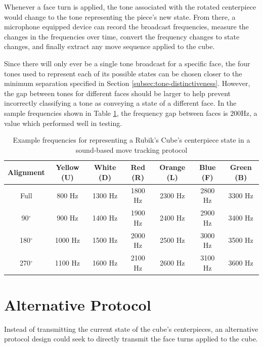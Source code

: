 Whenever a face turn is applied, the tone associated with the rotated centerpiece would change to the tone representing the piece's new state.
From there, a microphone equipped device can record the broadcast frequencies, measure the changes in the frequencies over time, convert the frequency changes to state changes, and finally extract any move sequence applied to the cube.

Since there will only ever be a single tone broadcast for a specific face, the four tones used to represent each of its possible states can be chosen closer to the minimum separation specified in Section \ref{subsec:tone-distinctiveness}. 
However, the gap between tones for different faces should be larger to help prevent incorrectly classifying a tone as conveying a state of a different face. 
In the sample frequencies shown in Table \ref{table:centerpiece-frequencies}, the frequency gap between faces is 200Hz, a value which performed well in testing.

\begin{table}[h]
    \centering
    \begin{tabular}{ | c | c | c | c | c | c | c | }
        \hline
        Alignment & Yellow (U) & White (D) & Red (R) & Orange (L) & Blue (F) & Green (B)\\
        \hline
        \hline
        Full & 800 Hz & 1300 Hz & 1800 Hz & 2300 Hz & 2800 Hz & 3300 Hz\\
        90$^\circ$ & 900 Hz & 1400 Hz & 1900 Hz & 2400 Hz & 2900 Hz & 3400 Hz\\
        180$^\circ$ & 1000 Hz & 1500 Hz & 2000 Hz & 2500 Hz & 3000 Hz & 3500 Hz\\
        270$^\circ$ & 1100 Hz & 1600 Hz & 2100 Hz & 2600 Hz & 3100 Hz & 3600 Hz\\
        \hline
    \end{tabular}
    \caption{Example frequencies for representing a Rubik's Cube's centerpiece state in a sound-based move tracking protocol}
    \label{table:centerpiece-frequencies}
\end{table}


\section{Alternative Protocol}
\label{sec:alternatives}
Instead of transmitting the current state of the cube's centerpieces, an alternative protocol design could seek to directly transmit the face turns applied to the cube.

